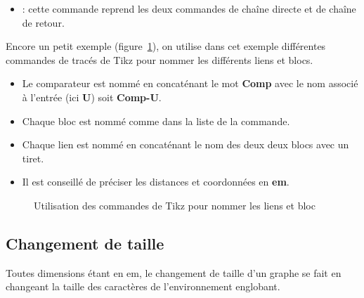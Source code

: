 \documentclass[a4paper,11pt]{article}                      %
\begin{document}
\begin{description}
\begin{itemize}
\item {\small {} }:  cette commande reprend les deux commandes de chaîne directe et de chaîne de retour.

\end{itemize}



\end{description}




Encore un  petit exemple (figure~\ref{fig:tikzliennom}), on utilise dans cet exemple différentes commandes de tracés de Tikz pour nommer les différents liens et blocs.
\begin{itemize}
\item Le comparateur est nommé en concaténant le mot \textbf{Comp} avec le nom associé à l'entrée (ici \textbf{U}) soit \textbf{Comp-U}.
\item Chaque bloc est nommé comme dans la liste de la commande.
\item Chaque lien est nommé en concaténant le nom des deux deux blocs avec un tiret.
\item Il est conseillé de préciser les distances et coordonnées en \textbf{em}.
\end{itemize}


\begin{figure}[!htb]
\centering
\begin{tikzexampleL}[title=,]
 \end{tikzexampleL}
\caption{Utilisation des commandes de Tikz pour nommer les liens et bloc}
\label{fig:tikzliennom}
\end{figure} 
 

\subsection{Changement de taille}

Toutes dimensions étant en em, le changement de taille d'un graphe se fait en changeant la taille des caractères de l'environnement englobant.
\end{document}
